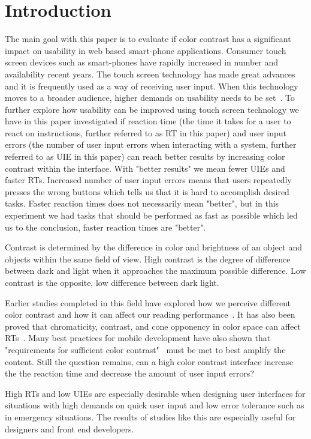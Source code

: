 \documentclass[runningheads,a4paper]{llncs}
\begin{document}
\section{Introduction}
The main goal with this paper is to evaluate if color contrast has a significant impact on usability in web based smart-phone applications. Consumer touch screen devices such as smart-phones have rapidly increased in number and availability recent years. The touch screen technology has made great advances~\cite{jennings2013touch} and it is frequently used as a way of receiving user input. When this technology moves to a broader audience, higher demands on usability needs to be set~\cite{gong2004guidelines}. To further explore how usability can be improved using touch screen technology we have in this paper investigated if reaction time (the time it takes for a user to react on instructions, further referred to as RT in this paper) and user input errors (the number of user input errors when interacting with a system, further referred to as UIE in this paper) can reach better results by increasing color contrast within the interface. With "better results" we mean fewer UIEs and faster RTs. Increased number of user input errors means that users repeatedly presses the wrong buttons which tells us that it is hard to accomplish desired tasks. Faster reaction times does not necessarily mean "better", but in this experiment we had tasks that should be performed as fast as possible which led us to the conclusion, faster reaction times are "better".

Contrast is determined by the difference in color and brightness of an object and objects within the same field of view. High contrast is the degree of difference between dark and light when it approaches the maximum possible difference. Low contrast is the opposite, low difference between dark light.

Earlier studies completed in this field have explored how we perceive different color contrast and how it can affect our reading performance~\cite{wu2003improving}. It has also been proved that chromaticity, contrast, and cone opponency in color space can affect RTs~\cite{mckeefry2003simple}. Many best practices for mobile development have also shown that "requirements for sufficient color contrast"~\cite{marcus2013design} must be met to best amplify the content. Still the question remains, can a high color contrast interface increase the the reaction time and decrease the amount of user input errors?

High RTs and low UIEs are especially desirable when designing user interfaces for situations with high demands on quick user input and low error tolerance such as in emergency situations. The results of studies like this are especially useful for designers and front end developers.
\end{document}
